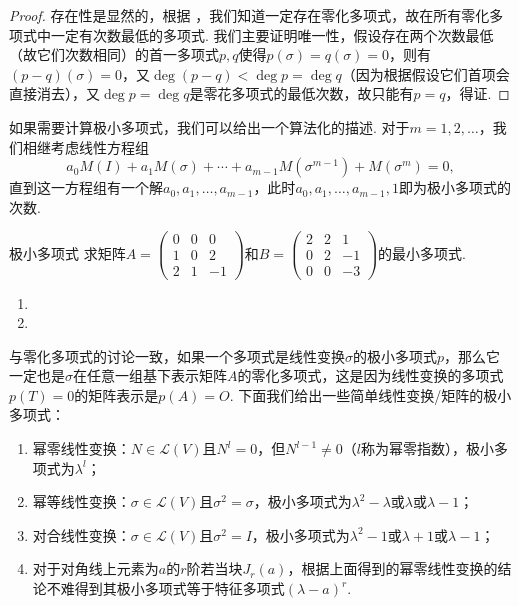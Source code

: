 \begin{proof}
    存在性是显然的，根据 ，我们知道一定存在零化多项式，故在所有零化多项式中一定有次数最低的多项式. 我们主要证明唯一性，假设存在两个次数最低（故它们次数相同）的首一多项式$p,q$使得$p(\sigma)=q(\sigma)=0$，则有$(p-q)(\sigma)=0$，又$\deg(p-q)<\deg p=\deg q$（因为根据假设它们首项会直接消去），又$\deg p=\deg q$是零花多项式的最低次数，故只能有$p=q$，得证.
\end{proof}

如果需要计算极小多项式，我们可以给出一个算法化的描述. 对于$m=1,2,\ldots$，我们相继考虑线性方程组
\[a_0M(I)+a_1M(\sigma)+\cdots+a_{m-1}M(\sigma^{m-1})+M(\sigma^m)=0,\]
直到这一方程组有一个解$a_0,a_1,\ldots,a_{m-1}$，此时$a_0,a_1,\ldots,a_{m-1},1$即为极小多项式的次数.
\begin{example}{}{极小多项式}
    求矩阵$A=\begin{pmatrix}
            0 & 0 & 0 \\ 1 & 0 & 2 \\ 2 & 1 & -1
        \end{pmatrix}$和$B=\begin{pmatrix}
            2 & 2 & 1 \\ 0 & 2 & -1 \\ 0 & 0 & -3
        \end{pmatrix}$的最小多项式.
\end{example}

\begin{solution}
    \begin{enumerate}
        \item

        \item
    \end{enumerate}
\end{solution}

与零化多项式的讨论一致，如果一个多项式是线性变换$\sigma$的极小多项式$p$，那么它一定也是$\sigma$在任意一组基下表示矩阵$A$的零化多项式，这是因为线性变换的多项式$p(T)=0$的矩阵表示是$p(A)=O$. 下面我们给出一些简单线性变换/矩阵的极小多项式：
\begin{enumerate}
    \item 幂零线性变换：$N\in \mathcal{L}(V)$且$N^l=0$，但$N^{l-1}\neq 0$（$l$称为幂零指数），极小多项式为$\lambda^l$；

    \item 幂等线性变换：$\sigma\in \mathcal{L}(V)$且$\sigma^2=\sigma$，极小多项式为$\lambda^2-\lambda$或$\lambda$或$\lambda-1$；

    \item 对合线性变换：$\sigma\in \mathcal{L}(V)$且$\sigma^2=I$，极小多项式为$\lambda^2-1$或$\lambda+1$或$\lambda-1$；

    \item 对于对角线上元素为$a$的$r$阶若当块$J_r(a)$，根据上面得到的幂零线性变换的结论不难得到其极小多项式等于特征多项式$(\lambda-a)^r$.
\end{enumerate}

